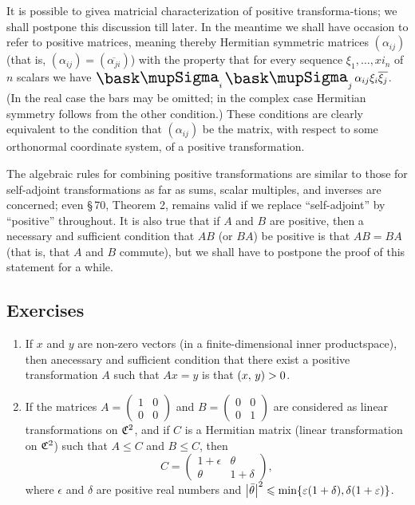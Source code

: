 It is possible to givea matricial characterization of positive transforma-tions;
we shall postpone this discussion till later. In the meantime we shall have
occasion to refer to positive matrices, meaning thereby Hermitian symmetric
matrices \((\alpha_{ij})\) (that is, \((\alpha_{ij}) =
(\overline{\alpha_{ji}})\)) with the property that for every sequence \(\xi_1,
\ldots, xi_n\) of \(n\) scalars we have \(\sumx_i \sumx_j \alpha_{ij} \xi_i
\overline{\xi_j}\). (In the real case the bars may be omitted; in the complex
case Hermitian symmetry follows from the other condition.) These conditions are
clearly equivalent to the condition that \((\alpha_{ij})\) be the matrix, with
respect to some orthonormal coordinate system, of a positive transformation.

The algebraic rules for combining positive transformations are similar to those
for self-adjoint transformations as far as sums, scalar multiples, and inverses
are concerned; even \S\,70, Theorem 2, remains valid if we replace
``self-adjoint'' by ``positive'' throughout. It is also true that if \(A\) and
\(B\) are positive, then a necessary and sufficient condition that \(AB\) (or
\(BA\)) be positive is that \(AB = BA\) (that is, that \(A\) and \(B\) commute),
but we shall have to postpone the proof of this statement for a while.

{\small
\subsection*{Exercises}
\begin{enumerate}[wide]
    \item If \(x\) and \(y\) are non-zero vectors (in a finite-dimensional inner
    productspace), then anecessary and sufficient condition that there exist a
    positive transformation \(A\) such that \(Ax = y\) is that
    \(\left(x,\,y\right) > 0\).

    \item If the matrices \(A = \begin{pmatrix}
        1 & 0 \\ 0 & 0
    \end{pmatrix}\) and \(B = \begin{pmatrix}
        0 & 0 \\ 0 & 1
    \end{pmatrix}\) are considered as linear transformations on \(\mathfrak{C}^2\), and if \(C\) is a Hermitian matrix (linear transformation on \(\mathfrak{C}^2\)) such that \(A \leq C\) and \(B \leq C\), then
    \begin{equation*}
        C = \begin{pmatrix}
            1 + \epsilon & \theta \\ \theta & 1 + \delta
        \end{pmatrix},
    \end{equation*}
    where \(\epsilon\) and \(\delta\) are positive real numbers and \(\left\lvert\bar{\theta}\right\rvert^2 \leqslant \min \{ \varepsilon(1 + \delta), \delta(1 + \varepsilon) \}\).
\end{enumerate}
}

